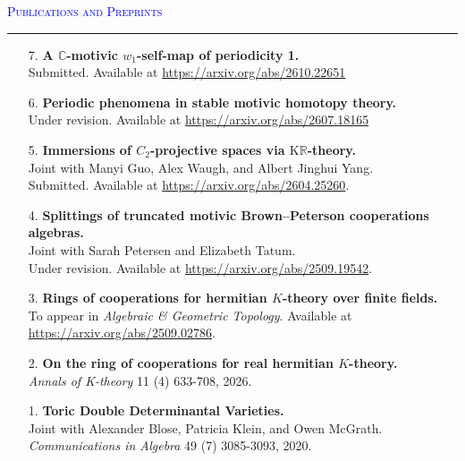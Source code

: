 \documentclass[10pt]{article}
\newcommand{\grey}[1]{\textcolor{cvgrey}{#1}}
\newenvironment{rSection}[1]{ %
  \medskip
  {\large\scshape\textcolor{Blue}{#1}} %
  \smallskip
  \hrule %
  \begin{list}{}{ %
    \setlength{\leftmargin}{0em} %
  }
  \item[]
}{
  \end{list}
}
\begin{document}
\begin{rSection}{Publications and Preprints}
\begin{itemize}
    Joint with Sarah Petersen and Elizabeth Tatum.\\
    \grey{In preparation.}
    \item[7.] \textbf{A $\mathbb{C}$-motivic $w_1$-self-map of periodicity 1.}\\
    \grey{Submitted. Available at \textcolor{purple!90!black}{\url{https://arxiv.org/abs/2610.22651}}}
    \item[6.] \textbf{Periodic phenomena in stable motivic homotopy theory.}\\
    \grey{Under revision. Available at \textcolor{purple!90!black}{\url{https://arxiv.org/abs/2607.18165}}}
    \item[5.] \textbf{Immersions of $C_2$-projective spaces via $\mathrm{K}\mathbb{R}$-theory.}\\
    Joint with Manyi Guo, Alex Waugh, and Albert Jinghui Yang.\\
    \grey{Submitted. Available at \textcolor{purple!90!black}{\url{https://arxiv.org/abs/2604.25260}}.}
    \item[4.] \textbf{Splittings of truncated motivic Brown--Peterson cooperations algebras.}\\
    Joint with Sarah Petersen and Elizabeth Tatum. \\
    \grey{Under revision. Available at \textcolor{purple!90!black}{\url{https://arxiv.org/abs/2509.19542}}.}
    \item[3.] \textbf{Rings of cooperations for hermitian $K$-theory over finite fields.}\\
    \grey{To appear in \emph{Algebraic \& Geometric Topology}. Available at \textcolor{purple!90!black}{\url{https://arxiv.org/abs/2509.02786}}.}
    \item[2.] \textbf{On the ring of cooperations for real hermitian $K$-theory.} \\
    \grey{\emph{Annals of K-theory} 11 (4) 633-708, 2026.}
    \item[1.] \textbf{Toric Double Determinantal Varieties.}\\
    Joint with Alexander Blose, Patricia Klein, and Owen McGrath. \\
    \grey{\emph{Communications in Algebra} 49 (7) 3085-3093, 2020.} 
\end{itemize}
\end{rSection}

\newpage
\end{document}
